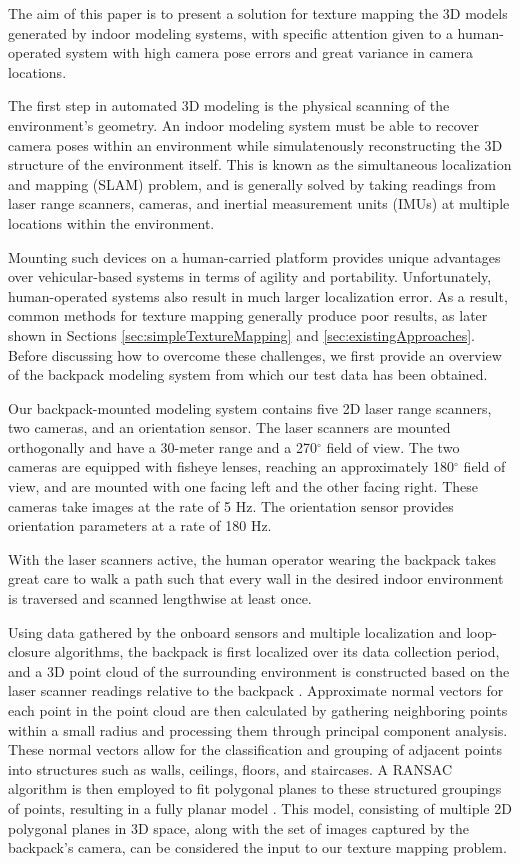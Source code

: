 \documentclass[10pt,twocolumn,letterpaper]{article}
\begin{document}
The aim of this paper is to present a solution for texture mapping the
3D models generated by indoor modeling systems, with specific
attention given to a human-operated system with high camera pose
errors and great variance in camera locations.

The first step in automated 3D modeling is the physical scanning of
the environment's geometry. An indoor modeling system must be able to
recover camera poses within an environment while simulatenously
reconstructing the 3D structure of the environment itself. This is
known as the simultaneous localization and mapping (SLAM) problem, and
is generally solved by taking readings from laser range scanners,
cameras, and inertial measurement units (IMUs) at multiple locations
within the environment.

Mounting such devices on a human-carried platform provides unique
advantages over vehicular-based systems in terms of agility and
portability. Unfortunately, human-operated systems also result in much
larger localization error. As a result, common methods for texture
mapping generally produce poor results, as later shown in Sections
\ref{sec:simpleTextureMapping} and
\ref{sec:existingApproaches}. Before discussing how to overcome these
challenges, we first provide an overview of the backpack modeling
system from which our test data has been obtained.

Our backpack-mounted modeling system contains five 2D laser range
scanners, two cameras, and an orientation sensor. The laser scanners
are mounted orthogonally and have a 30-meter range and a 270$^{\circ}$
field of view. The two cameras are equipped with fisheye lenses,
reaching an approximately 180$^{\circ}$ field of view, and are mounted
with one facing left and the other facing right. These cameras take
images at the rate of 5 Hz. The orientation sensor provides
orientation parameters at a rate of 180 Hz.

With the laser scanners active, the human operator wearing the
backpack takes great care to walk a path such that every wall in the
desired indoor environment is traversed and scanned lengthwise at
least once.

Using data gathered by the onboard sensors and multiple localization
and loop-closure algorithms, the backpack is first localized over its
data collection period, and a 3D point cloud of the surrounding
environment is constructed based on the laser scanner readings
relative to the backpack \cite{chen2010indoor, kua2012loopclosure, liu2010indoor}. Approximate normal vectors for each point in
the point cloud are then calculated by gathering neighboring points
within a small radius and processing them through principal component
analysis. These normal vectors allow for the classification and
grouping of adjacent points into structures such as walls, ceilings,
floors, and staircases. A RANSAC algorithm is then employed to fit
polygonal planes to these structured groupings of points, resulting in
a fully planar model \cite{sanchez2012point}. This model, consisting
of multiple 2D polygonal planes in 3D space, along with the set of
images captured by the backpack's camera, can be considered the input
to our texture mapping problem.
\end{document}
